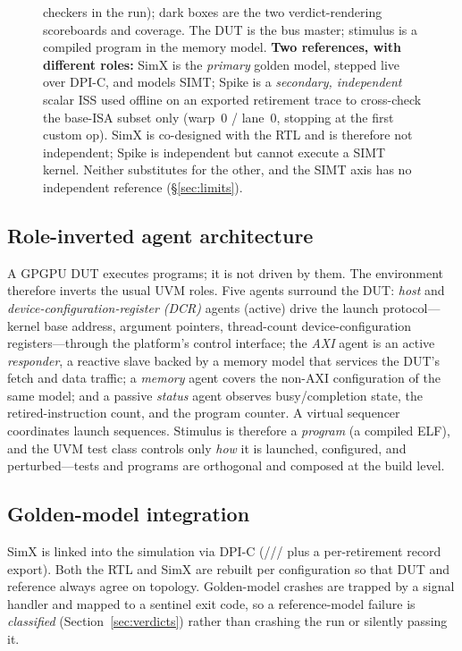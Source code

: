 \documentclass[conference]{IEEEtran}
\newcommand{\code}[1]{\texttt{\detokenize{#1}}}
\begin{document}
\begin{figure}[t]
{		checkers in the run); dark boxes are the two verdict-rendering
		scoreboards and coverage. The DUT is the bus master; stimulus is a
		compiled program in the memory model. \textbf{Two references, with
			different roles:} SimX is the \emph{primary} golden model, stepped live
		over DPI-C, and models SIMT; Spike is a \emph{secondary, independent}
		scalar ISS used offline on an exported retirement trace to cross-check
		the base-ISA subset only (warp~0 / lane~0, stopping at the first custom
		op). SimX is co-designed with the RTL and is therefore not independent;
		Spike is independent but cannot execute a SIMT kernel. Neither
		substitutes for the other, and the SIMT axis has no independent
		reference (\S\ref{sec:limits}).}
	\label{fig:arch}
\end{figure}

\subsection{Role-inverted agent architecture}
A GPGPU DUT executes programs; it is not driven by them. The
environment therefore inverts the usual UVM roles. Five agents surround
the DUT: \emph{host} and \emph{device-configuration-register (DCR)}
agents (active) drive the launch protocol---kernel base address,
argument pointers, thread-count device-configuration registers---through
the platform's control interface; the \emph{AXI} agent is an active
\emph{responder}, a reactive slave backed by a memory model that
services the DUT's fetch and data traffic; a \emph{memory} agent covers
the non-AXI configuration of the same model; and a passive \emph{status}
agent observes busy/completion state, the retired-instruction count, and
the program counter. A virtual sequencer coordinates launch sequences.
Stimulus is therefore a \emph{program} (a compiled ELF), and the UVM
test class controls only \emph{how} it is launched, configured, and
perturbed---tests and programs are orthogonal and composed at the build
level.

\subsection{Golden-model integration}
SimX is linked into the simulation via DPI-C
(\code{simx_init}/\code{load}/\code{dcr_write}/\code{run} plus a
per-retirement record export). Both the RTL and SimX are rebuilt per
configuration so that DUT and reference always agree on topology.
Golden-model crashes are trapped by a signal handler and mapped to a
sentinel exit code, so a reference-model failure is \emph{classified}
(Section~\ref{sec:verdicts}) rather than crashing the run or silently
passing it.
\end{document}
